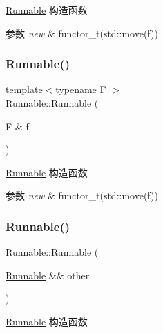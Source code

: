 \hyperlink{classRunnable}{Runnable} 构造函数 


\begin{DoxyParams}{参数}
{\em new} & functor\+\_\+t(std\+::move(f)) \\
\hline
\end{DoxyParams}
\mbox{\label{classRunnable_aaac34b8a861ab506499f8ec791e7cc16}} 
\subsubsection{\texorpdfstring{Runnable()}{Runnable()}\hspace{0.1cm}{\footnotesize\ttfamily [2/4]}}
{\footnotesize\ttfamily template$<$typename F $>$ \\
Runnable\+::\+Runnable (\begin{DoxyParamCaption}\item[{F \&}]{f }\end{DoxyParamCaption})\hspace{0.3cm}{\ttfamily [inline]}}



\hyperlink{classRunnable}{Runnable} 构造函数 


\begin{DoxyParams}{参数}
{\em new} & functor\+\_\+t(std\+::move(f)) \\
\hline
\end{DoxyParams}
\mbox{\label{classRunnable_af028c95562f219c2af2439ae69e44755}} 
\subsubsection{\texorpdfstring{Runnable()}{Runnable()}\hspace{0.1cm}{\footnotesize\ttfamily [3/4]}}
{\footnotesize\ttfamily Runnable\+::\+Runnable (\begin{DoxyParamCaption}\item[{\hyperlink{classRunnable}{Runnable} \&\&}]{other }\end{DoxyParamCaption})\hspace{0.3cm}{\ttfamily [inline]}}



\hyperlink{classRunnable}{Runnable} 构造函数 


